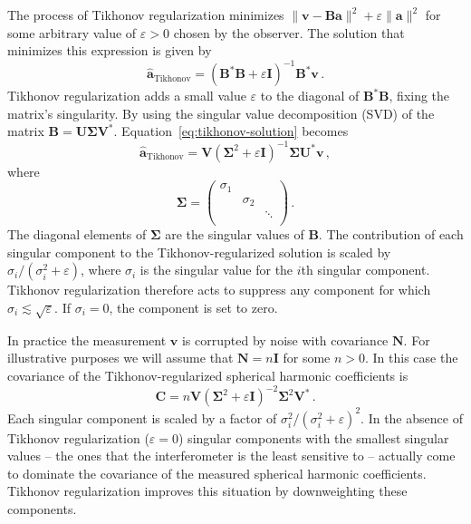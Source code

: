 \documentclass[twocolumn]{aastex61}
\renewcommand{\b}{\pmb}
\newcommand{\atikh}{\b{\hat a}_\text{Tikhonov}}
\begin{document}
The process of Tikhonov regularization minimizes $\|\b v - \b B\b a\|^2 + \varepsilon\|\b a\|^2$ for
some arbitrary value of $\varepsilon > 0$ chosen by the observer. The solution that minimizes this
expression is given by
\begin{equation}\label{eq:tikhonov-solution}
    \atikh = (\b B^*\b B + \varepsilon\b I)^{-1}\b B^*\b v\,.
\end{equation}
Tikhonov regularization adds a small value $\varepsilon$ to the diagonal of $\b B^*\b B$, fixing the
matrix's singularity. By using the singular value decomposition (SVD) of the matrix $\b B = \b U \b
\Sigma \b V^*$. Equation~\ref{eq:tikhonov-solution} becomes
\begin{equation}
    \atikh = \b V (\b\Sigma^2 + \varepsilon \b I)^{-1}\b\Sigma \b U^*\b v\,,
\end{equation}
where
\[
    \b\Sigma = \left(
        \begin{array}{ccc}
            \sigma_1 & & \\
                     & \sigma_2 & \\
                     & & \ddots \\
        \end{array}
    \right)\,.
\]
The diagonal elements of $\b\Sigma$ are the singular values of $\b B$. The contribution of each
singular component to the Tikhonov-regularized solution is scaled by $\sigma_i / (\sigma_i^2 +
\varepsilon)$, where $\sigma_i$ is the singular value for the $i$th singular component. Tikhonov
regularization therefore acts to suppress any component for which
$\sigma_i\lesssim\sqrt{\varepsilon}$.  If $\sigma_i = 0$, the component is set to zero.

In practice the measurement $\b v$ is corrupted by noise with covariance $\b N$. For illustrative
purposes we will assume that $\b N=n\b I$ for some $n>0$. In this case the covariance of the
Tikhonov-regularized spherical harmonic coefficients is
\begin{equation}
    \b C = n \b V (\b\Sigma^2 + \varepsilon\b I)^{-2} \b\Sigma^2 \b V^*\,.
\end{equation}
Each singular component is scaled by a factor of $\sigma_i^2/(\sigma_i^2 + \varepsilon)^2$.  In the
absence of Tikhonov regularization ($\varepsilon=0$) singular components with the smallest singular
values -- the ones that the interferometer is the least sensitive to -- actually come to dominate
the covariance of the measured spherical harmonic coefficients. Tikhonov regularization improves
this situation by downweighting these components.
\end{document}
